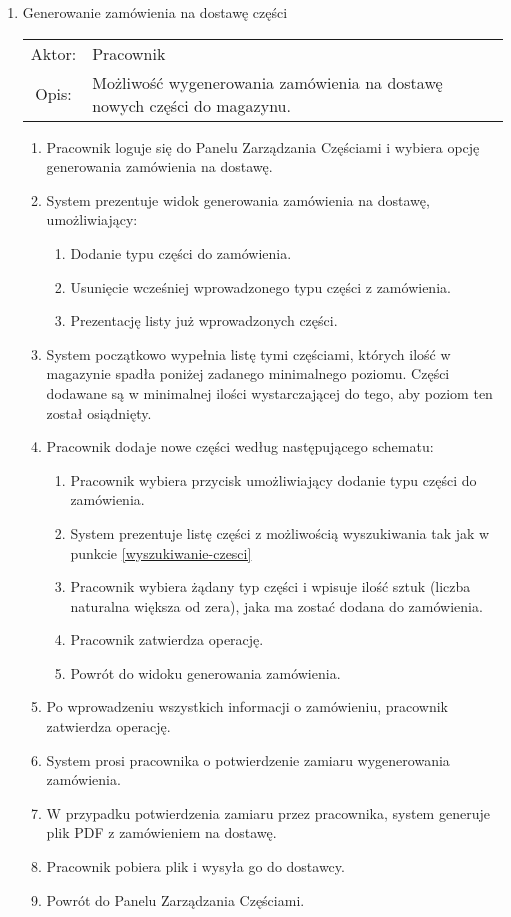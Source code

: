\begin{enumerate}
  \item Generowanie zamówienia na dostawę części \label{generowanie-zamowienia} \\
  \begin{tabularx}{\linewidth}{ c X }
  Aktor: & Pracownik \\
  Opis: & Możliwość wygenerowania zamówienia na dostawę nowych części do magazynu.\\
  \end{tabularx}
   \begin{enumerate}
    \item Pracownik loguje się do Panelu Zarządzania Częściami i wybiera opcję generowania zamówienia na dostawę.
    \item System prezentuje widok generowania zamówienia na dostawę, umożliwiający:
    \begin{enumerate}
      \item Dodanie typu części do zamówienia.
      \item Usunięcie wcześniej wprowadzonego typu części z zamówienia.
      \item Prezentację listy już wprowadzonych części.
    \end{enumerate}
    \item System początkowo wypełnia listę tymi częściami, których ilość w magazynie spadła poniżej zadanego minimalnego poziomu. Części dodawane są w minimalnej ilości wystarczającej do tego, aby poziom ten został osiądnięty.
    \item Pracownik dodaje nowe części według następującego schematu:
    \begin{enumerate}
      \item Pracownik wybiera przycisk umożliwiający dodanie typu części do zamówienia.
      \item System prezentuje listę części z możliwością wyszukiwania tak jak w punkcie \ref{wyszukiwanie-czesci}
      \item Pracownik wybiera żądany typ części i wpisuje ilość sztuk (liczba naturalna większa od zera), jaka ma zostać dodana do zamówienia.
      \item Pracownik zatwierdza operację.
      \item Powrót do widoku generowania zamówienia.
    \end{enumerate}
    \item Po wprowadzeniu wszystkich informacji o zamówieniu, pracownik zatwierdza operację.
    \item System prosi pracownika o potwierdzenie zamiaru wygenerowania zamówienia.
    \item W przypadku potwierdzenia zamiaru przez pracownika, system generuje plik PDF z zamówieniem na dostawę.
    \item Pracownik pobiera plik i wysyła go do dostawcy.
    \item Powrót do Panelu Zarządzania Częściami.
  \end{enumerate}
  

\end{enumerate}
